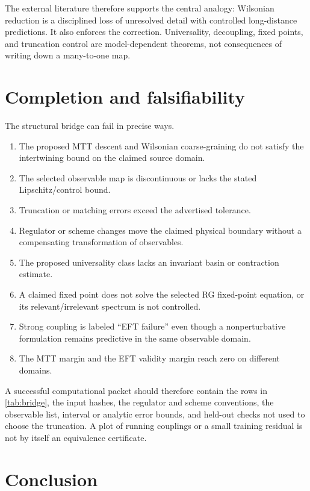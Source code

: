 \documentclass[11pt]{article}
\theoremstyle{definition}
\theoremstyle{remark}
\begin{document}
The external literature therefore supports the central analogy: Wilsonian
reduction is a disciplined loss of unresolved detail with controlled
long-distance predictions.  It also enforces the correction.  Universality,
decoupling, fixed points, and truncation control are model-dependent theorems,
not consequences of writing down a many-to-one map.

\section{Completion and falsifiability}

The structural bridge can fail in precise ways.

\begin{enumerate}[label=(F\arabic*)]
\item The proposed MTT descent and Wilsonian coarse-graining do not satisfy
  the intertwining bound on the claimed source domain.
\item The selected observable map is discontinuous or lacks the stated
  Lipschitz/control bound.
\item Truncation or matching errors exceed the advertised tolerance.
\item Regulator or scheme changes move the claimed physical boundary without
  a compensating transformation of observables.
\item The proposed universality class lacks an invariant basin or contraction
  estimate.
\item A claimed fixed point does not solve the selected RG fixed-point
  equation, or its relevant/irrelevant spectrum is not controlled.
\item Strong coupling is labeled ``EFT failure'' even though a
  nonperturbative formulation remains predictive in the same observable
  domain.
\item The MTT margin and the EFT validity margin reach zero on different
  domains.
\end{enumerate}

A successful computational packet should therefore contain the rows in
\cref{tab:bridge}, the input hashes, the regulator and scheme conventions,
the observable list, interval or analytic error bounds, and held-out checks
not used to choose the truncation.  A plot of running couplings or a small
training residual is not by itself an equivalence certificate.

\section{Conclusion}
\end{document}

